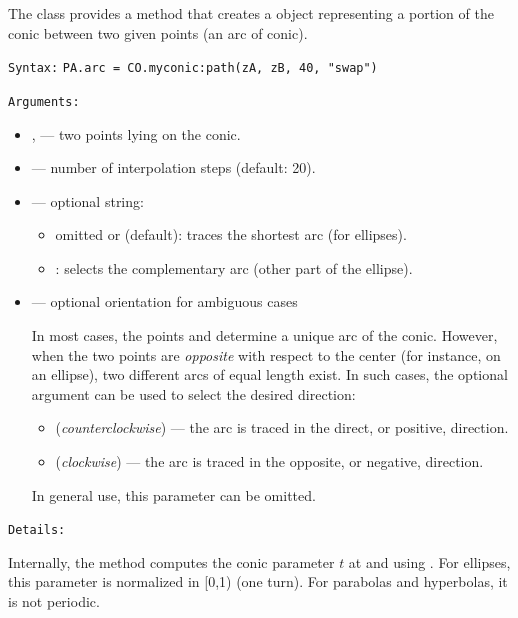 The  class provides a method  that creates a
 object representing a portion of the conic between two given
points (an arc of conic).

\medskip
\texttt{Syntax:}
\verb|PA.arc = CO.myconic:path(zA, zB, 40, "swap")|

\texttt{Arguments:}

\begin{itemize}
  \item {},  — two points lying on the conic.
  \item {} — number of interpolation steps (default: 20).
  \item {} — optional string:
  \begin{itemize}
      \item omitted or  (default): traces the shortest arc (for ellipses).
      \item {}: selects the complementary arc (other part of the ellipse).
  \end{itemize}
  \item {} — optional orientation for ambiguous cases

        In most cases, the points  and  determine a unique arc of the conic.
        However, when the two points are \emph{opposite} with respect to the center (for instance, on an ellipse),
        two different arcs of equal length exist.
        In such cases, the optional argument can be used to select the desired direction:

        \begin{itemize}
          \item {} (\emph{counterclockwise}) — the arc is traced in the direct, or positive, direction.
          \item {} (\emph{clockwise}) — the arc is traced in the opposite, or negative, direction.
        \end{itemize}

   In general use, this parameter can be omitted.
\end{itemize}

\medskip
\texttt{Details:}

Internally, the method computes the conic parameter $t$ at  and  using . For ellipses, this parameter is normalized in [0,1) (one turn). For parabolas and hyperbolas, it is not periodic.

